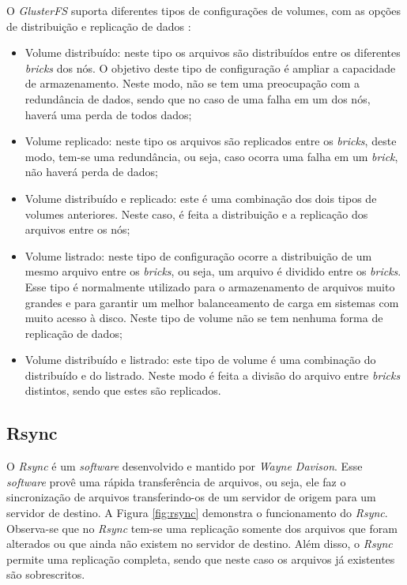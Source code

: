 O \textit{GlusterFS} suporta diferentes tipos de configurações de volumes, com as opções de distribuição e replicação de dados \cite{glusterfs}:
\begin{itemize}
 \item Volume distribuído: neste tipo os arquivos são distribuídos entre os diferentes \textit{bricks} dos nós. O objetivo deste tipo de 
 configuração é ampliar a capacidade de armazenamento. Neste modo, não se tem uma preocupação com a redundância de dados, sendo que no caso de uma
 falha em um dos nós, haverá uma perda de todos dados;
 \item Volume replicado: neste tipo os arquivos são replicados entre os \textit{bricks}, deste modo, tem-se uma redundância, ou seja, caso ocorra
 uma falha em um \textit{brick}, não haverá perda de dados;
 \item Volume distribuído e replicado: este é uma combinação dos dois tipos de volumes anteriores. Neste caso, é feita a distribuição 
 e a replicação dos arquivos entre os nós;
 \item Volume listrado: neste tipo de configuração ocorre a distribuição de um mesmo arquivo entre os \textit{bricks}, ou seja, um arquivo é 
 dividido entre os \textit{bricks}. Esse tipo é normalmente utilizado para o armazenamento de arquivos muito grandes e para garantir um melhor 
 balanceamento de carga em sistemas com muito acesso à disco. Neste tipo de volume não se tem nenhuma forma de replicação de dados;
 \item Volume distribuído e listrado: este tipo de volume é uma combinação do distribuído e do listrado. Neste modo é feita a divisão do arquivo 
 entre \textit{bricks} distintos, sendo que estes são replicados.
\end{itemize}

\subsection{Rsync}
\label{section:rsync}
O \textit{Rsync} \cite{rsync} é um \textit{software} desenvolvido e mantido por \textit{Wayne Davison}. Esse \textit{software} provê uma rápida
transferência de arquivos, ou seja, ele faz o sincronização de arquivos transferindo-os de um servidor de origem para um servidor de destino. 
A Figura \ref{fig:rsync} demonstra o funcionamento do \textit{Rsync}. Observa-se que no \textit{Rsync} tem-se uma replicação somente dos 
arquivos que foram alterados ou que ainda não existem no servidor de destino. Além disso, o \textit{Rsync} permite uma replicação completa, 
sendo que neste caso os arquivos já existentes são sobrescritos.

